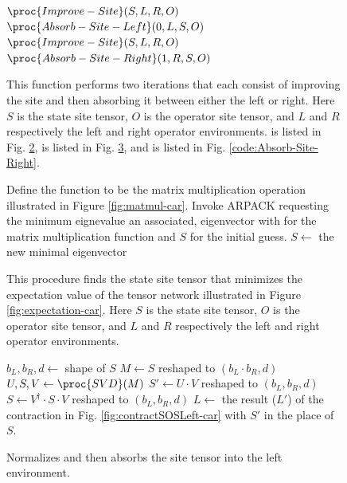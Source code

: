 \documentclass{article}
\begin{document}
\begin{figure}
\begin{codebox}
\li $\proc{Improve-Site}(S,L,R,O)$
\li $\proc{Absorb-Site-Left}(0,L,S,O)$
\li $\proc{Improve-Site}(S,L,R,O)$
\li $\proc{Absorb-Site-Right}(1,R,S,O)$
\end{codebox}
\caption{\label{code:Perform-Sweep} This function performs two iterations that each consist of improving the site and then absorbing it between either the left or right.  Here $S$ is the state site tensor, $O$ is the operator site tensor, and $L$ and $R$ respectively the left and right operator environments.   is listed in Fig. \ref{code:Improve-Site},  is listed in Fig. \ref{code:Absorb-Site-Left}, and  is listed in Fig. \ref{code:Absorb-Site-Right}.}
\end{figure}

\begin{figure}
\begin{codebox}
\li Define the function  to be the matrix multiplication operation
\zi illustrated in Figure \ref{fig:matmul-car}.
\li Invoke ARPACK requesting the minimum eignevalue an associated,
\zi eigenvector with  for the matrix multiplication function and
\zi $S$ for the initial guess.
\li $S \gets$ the new minimal eigenvector
\end{codebox}
\caption{\label{code:Improve-Site}This procedure finds the state site tensor that minimizes the expectation value of the tensor network illustrated in Figure \ref{fig:expectation-car}. Here $S$ is the state site tensor, $O$ is the operator site tensor, and $L$ and $R$ respectively the left and right operator environments.}
\end{figure}

\begin{figure}
\begin{codebox}
\li $b_L, b_R, d \gets $ shape of $S$
\li $M \gets S$ reshaped to $(b_L\cdot b_R, d)$
\li $U, S, V \gets \proc{SVD}(M)$
\li $S' \gets U\cdot V$ reshaped to $(b_L,b_R, d)$
\li $S \gets V^\dagger \cdot S \cdot V$ reshaped to $(b_L,b_R, d)$
\li $L \gets $ the result ($L'$) of the contraction in Fig. \ref{fig:contractSOSLeft-car} with $S'$ in the place of $S$.
\end{codebox}
\caption{\label{code:Absorb-Site-Left} Normalizes and then absorbs the site tensor into the left environment.}
\end{figure}
\end{document}
